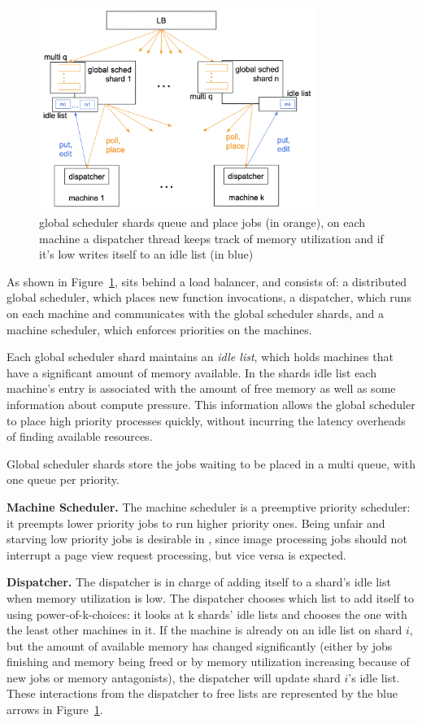 \begin{figure}[t]
    \centering
      \includegraphics[width=9cm]{img/overview.png}
      \caption{ global scheduler shards queue and place jobs (in orange), 
      on each machine a dispatcher thread keeps track of memory utilization 
      and if it's low writes itself to an idle list (in blue) }
    \label{fig:overview}
\end{figure}
  

As shown in Figure~\ref{fig:overview}, \sys{} sits behind a load balancer, and
consists of: a distributed global scheduler, which places new function
invocations, a dispatcher, which runs on each machine and communicates with the
global scheduler shards, and a machine scheduler, which enforces priorities on
the machines.

Each global scheduler shard maintains an \textit{idle list}, which holds
machines that have a significant amount of memory available. In the shards idle
list each machine's entry is associated with the amount of free memory as well
as some information about compute pressure. This information allows the global
scheduler to place high priority processes quickly, without incurring the
latency overheads of finding available resources.

Global scheduler shards store the jobs waiting to be placed in a multi queue,
with one queue per priority.


\textbf{Machine Scheduler.}
The machine scheduler is a preemptive priority scheduler: it preempts lower
priority jobs to run higher priority ones. Being unfair and starving low
priority jobs is desirable in \sys{}, since image processing jobs should not
interrupt a page view request processing, but vice versa is expected.


\textbf{Dispatcher.}
The dispatcher is in charge of adding itself to a shard's idle list when memory
utilization is low. The dispatcher chooses which list to add itself to using
power-of-k-choices: it looks at k shards' idle lists and chooses the one with
the least other machines in it. If the machine is already on an idle list on
shard $i$, but the amount of available memory has changed significantly (either
by jobs finishing and memory being freed or by memory utilization increasing
because of new jobs or memory antagonists), the dispatcher will update shard
$i$'s idle list. These interactions from the dispatcher to free lists are
represented by the blue arrows in Figure~\ref{fig:overview}.

